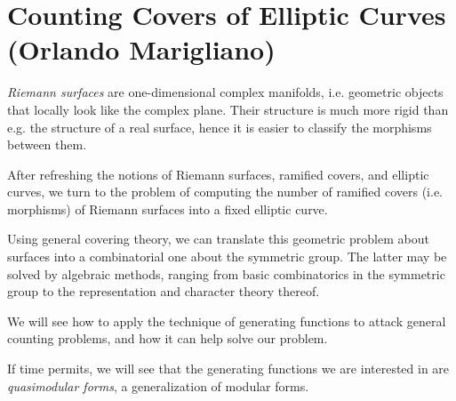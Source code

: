 \section{Counting Covers of Elliptic Curves (Orlando Marigliano)}

\emph{Riemann surfaces} are one-dimensional complex manifolds, i.e.
geometric objects that locally look like the complex plane. Their structure
is much more rigid than e.g. the structure of a real surface, hence it is
easier to classify the morphisms between them.

After refreshing the notions of Riemann surfaces, ramified covers, and
elliptic curves, we turn to the problem of computing the number of ramified
covers (i.e. morphisms) of Riemann surfaces into a fixed elliptic curve.

Using general covering theory, we can translate this geometric problem about
surfaces into
a combinatorial one about the symmetric group. The latter may be solved by
algebraic methods, ranging from basic
combinatorics in the symmetric group to the representation and character
theory thereof.

We will see how to apply the technique of generating functions to attack
general counting problems, and how it can help solve our problem.

If time permits, we will see that the generating functions we are interested
in are \emph{quasimodular forms}, a generalization of modular forms.
